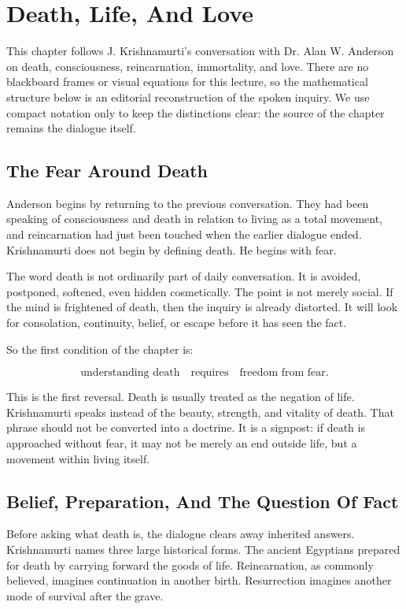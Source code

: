 \chapter{Death, Life, And Love}

This chapter follows J. Krishnamurti's conversation with Dr. Alan W. Anderson on death, consciousness, reincarnation, immortality, and love. There are no blackboard frames or visual equations for this lecture, so the mathematical structure below is an editorial reconstruction of the spoken inquiry. We use compact notation only to keep the distinctions clear: the source of the chapter remains the dialogue itself.

\section{The Fear Around Death}

Anderson begins by returning to the previous conversation. They had been speaking of consciousness and death in relation to living as a total movement, and reincarnation had just been touched when the earlier dialogue ended. Krishnamurti does not begin by defining death. He begins with fear.

The word death is not ordinarily part of daily conversation. It is avoided, postponed, softened, even hidden cosmetically. The point is not merely social. If the mind is frightened of death, then the inquiry is already distorted. It will look for consolation, continuity, belief, or escape before it has seen the fact.

So the first condition of the chapter is:

\begin{equation}
\text{understanding death}
\quad\text{requires}\quad
\text{freedom from fear}.
\end{equation}

This is the first reversal. Death is usually treated as the negation of life. Krishnamurti speaks instead of the beauty, strength, and vitality of death. That phrase should not be converted into a doctrine. It is a signpost: if death is approached without fear, it may not be merely an end outside life, but a movement within living itself.

\section{Belief, Preparation, And The Question Of Fact}

Before asking what death is, the dialogue clears away inherited answers. Krishnamurti names three large historical forms. The ancient Egyptians prepared for death by carrying forward the goods of life. Reincarnation, as commonly believed, imagines continuation in another birth. Resurrection imagines another mode of survival after the grave.

